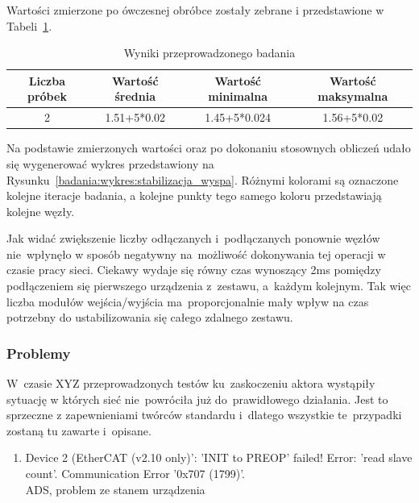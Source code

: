 Wartości zmierzone po ówczesnej obróbce zostały zebrane i przedstawione w Tabeli~\ref{badania:wyniki:stabilizacja_wyspa}.
\begin{table}[!htb]
\begin{center}
\begin{tabular}{| c | c | c | c |}\hline
\textbf{Liczba próbek} & \textbf{Wartość średnia} & \textbf{Wartość minimalna} & \textbf{Wartość maksymalna} \\\hline\hline
2 & 1.51+5*0.02 & 1.45+5*0.024 & 1.56+5*0.02 \\\hline
\end{tabular}
\end{center}
\vspace*{-6mm}
  \caption{Wyniki przeprowadzonego badania}
	\label{badania:wyniki:stabilizacja_wyspa}
\end{table}

Na podstawie zmierzonych wartości oraz po dokonaniu stosownych obliczeń udało się wygenerować wykres przedstawiony na Rysunku~\ref{badania:wykres:stabilizacja_wyspa}. Różnymi kolorami są oznaczone kolejne iteracje badania, a kolejne punkty tego samego koloru przedstawiają kolejne węzły.


Jak widać zwiększenie liczby odłączanych i~podłączanych ponownie węzłów nie~wpłynęło w sposób negatywny na~możliwość dokonywania tej operacji w czasie pracy sieci. Ciekawy wydaje się równy czas wynoszący 2ms pomiędzy podłączeniem się pierwszego urządzenia z~zestawu, a~każdym kolejnym. Tak więc liczba modułów wejścia/wyjścia ma~proporcjonalnie mały wpływ na czas potrzebny do ustabilizowania się całego zdalnego zestawu.

\subsubsection{Problemy}
W~czasie XYZ przeprowadzonych testów ku~zaskoczeniu aktora wystąpiły sytuację w których sieć nie~powróciła już do~prawidłowego działania. Jest to sprzeczne z zapewnieniami twórców standardu i~dlatego wszystkie te~przypadki zostaną tu zawarte i~opisane.

\begin{enumerate}
\item Device 2 (EtherCAT (v2.10 only)': 'INIT to PREOP' failed! Error: 'read slave count'. Communication Error '0x707 (1799)'. \\[1mm]
ADS, problem ze stanem urządzenia
\end{enumerate}

